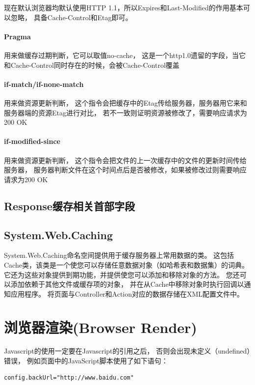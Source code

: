 \documentclass{book}
\begin{document}
现在默认浏览器均默认使用HTTP 1.1，所以Expires和Last-Modified的作用基本可以忽略，
具备Cache-Control和Etag即可。

\paragraph{Pragma}用来做缓存过期判断，它可以取值no-cache，
这是一个http1.0遗留的字段，当它和Cache-Control同时存在的时候，会被Cache-Control覆盖

\paragraph{if-match/if-none-match}用来做资源更新判断，
这个指令会把缓存中的Etag传给服务器，服务器用它来和服务器端的资源Etag进行对比，
若不一致则证明资源被修改了，需要响应请求为 200 OK

\paragraph{if-modified-since}用来做资源更新判断，
这个指令会把文件的上一次缓存中的文件的更新时间传给服务器，
服务器判断文件在这个时间点后是否被修改，如果被修改过则需要响应请求为200 OK

\subsection{Response缓存相关首部字段}

\subsection{System.Web.Caching}

System.Web.Caching命名空间提供用于缓存服务器上常用数据的类。
这包括Cache类，该类是一个使您可以存储任意数据对象（如哈希表和数据集）的词典。
它还为这些对象提供到期功能，并提供使您可以添加和移除对象的方法。
您还可以添加依赖于其他文件或缓存项的对象，
并在从Cache中移除对象时执行回调以通知应用程序。
将页面与Controller和Action对应的数据存储在XML配置文件中。

\section{浏览器渲染(Browser Render)}

Javascript的使用一定要在Javascript的引用之后，
否则会出现未定义（undefined）错误，
例如页面中的JavaScript脚本使用了如下语句：

\begin{lstlisting}[language=VBScript]
config.backUrl="http://www.baidu.com"
\end{lstlisting}
\end{document}
